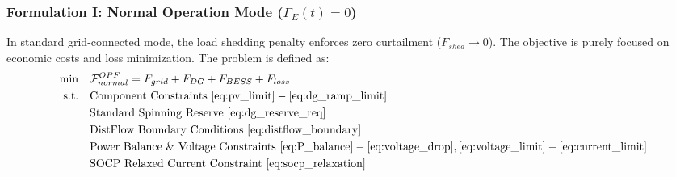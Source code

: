 \subsubsection{Formulation I: Normal Operation Mode ($\Gamma_E(t) = 0$)}
In standard grid-connected mode, the load shedding penalty enforces zero curtailment ($F_{shed} \to 0$). The objective is purely focused on economic costs and loss minimization. The problem is defined as:
\begin{equation}
\begin{aligned}
    \min \quad & \mathcal{F}_{normal}^{OPF} = F_{grid} + F_{DG} + F_{BESS} + F_{loss} \\
    \text{s.t.} \quad & \text{Component Constraints } \eqref{eq:pv_limit}-\eqref{eq:dg_ramp_limit} \\
    & \text{Standard Spinning Reserve } \eqref{eq:dg_reserve_req} \\
    & \text{DistFlow Boundary Conditions } \eqref{eq:distflow_boundary} \\
    & \text{Power Balance \& Voltage Constraints } \eqref{eq:P_balance}-\eqref{eq:voltage_drop}, \eqref{eq:voltage_limit}-\eqref{eq:current_limit} \\
    & \text{SOCP Relaxed Current Constraint } \eqref{eq:socp_relaxation}
\end{aligned}
\label{eq:total_objective_normal}
\end{equation}

